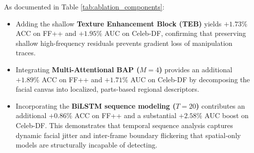 \begin{table}[ht]
    \centering
    \caption{Ablation Study of Architectural Components ($\text{Mean} \pm \text{Std Dev}$).}
    \label{tab:ablation_components}
    \par{}
\end{table}

As documented in Table \ref{tab:ablation_components}:
\begin{itemize}
    \item Adding the shallow \textbf{Texture Enhancement Block (TEB)} yields $+1.73\%$ ACC on FF++ and $+1.95\%$ AUC on Celeb-DF, confirming that preserving shallow high-frequency residuals prevents gradient loss of manipulation traces.
    \item Integrating \textbf{Multi-Attentional BAP ($M=4$)} provides an additional $+1.89\%$ ACC on FF++ and $+1.71\%$ AUC on Celeb-DF by decomposing the facial canvas into localized, parts-based regional descriptors.
    \item Incorporating the \textbf{BiLSTM sequence modeling ($T=20$)} contributes an additional $+0.86\%$ ACC on FF++ and a substantial $+2.58\%$ AUC boost on Celeb-DF. This demonstrates that temporal sequence analysis captures dynamic facial jitter and inter-frame boundary flickering that spatial-only models are structurally incapable of detecting.
\end{itemize}

